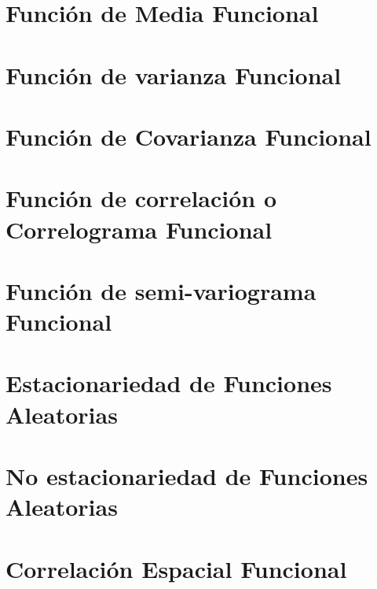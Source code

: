 \documentclass[
]{book}
\begin{document}
\hypertarget{funciuxf3n-de-media-funcional}{%
\section{Función de Media Funcional}\label{funciuxf3n-de-media-funcional}}

\hypertarget{funciuxf3n-de-varianza-funcional}{%
\section{Función de varianza Funcional}\label{funciuxf3n-de-varianza-funcional}}

\hypertarget{funciuxf3n-de-covarianza-funcional}{%
\section{Función de Covarianza Funcional}\label{funciuxf3n-de-covarianza-funcional}}

\hypertarget{funciuxf3n-de-correlaciuxf3n-o-correlograma-funcional}{%
\section{Función de correlación o Correlograma Funcional}\label{funciuxf3n-de-correlaciuxf3n-o-correlograma-funcional}}

\hypertarget{funciuxf3n-de-semi-variograma-funcional}{%
\section{Función de semi-variograma Funcional}\label{funciuxf3n-de-semi-variograma-funcional}}

\hypertarget{estacionariedad-de-funciones-aleatorias-1}{%
\section{Estacionariedad de Funciones Aleatorias}\label{estacionariedad-de-funciones-aleatorias-1}}

\hypertarget{no-estacionariedad-de-funciones-aleatorias-1}{%
\section{No estacionariedad de Funciones Aleatorias}\label{no-estacionariedad-de-funciones-aleatorias-1}}

\hypertarget{correlaciuxf3n-espacial-funcional}{%
\section{Correlación Espacial Funcional}\label{correlaciuxf3n-espacial-funcional}}
\end{document}
